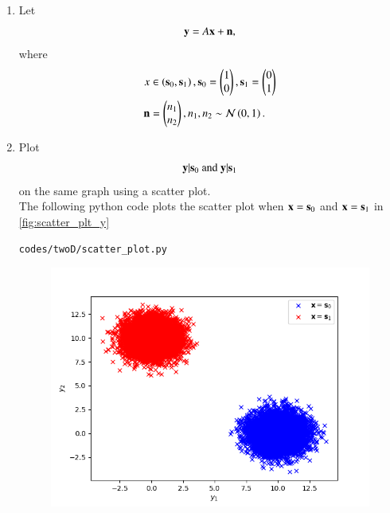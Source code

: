 \begin{enumerate}[label=\thesection.\arabic*.,ref=\thesection.\theenumi]
\item Let 
\begin{equation}
\mathbf{y} = A\mathbf{x} + \mathbf{n},
\end{equation}
where 
\begin{align}
x &\in \left(\mathbf{s}_0,\mathbf{s}_1\right), 
\mathbf{s}_0 = 
\begin{pmatrix}
1 
\\
0
\end{pmatrix},
\mathbf{s}_1 = 
\begin{pmatrix}
0 
\\
1
\end{pmatrix}
\\
\mathbf{n} &= 
\begin{pmatrix}
n_1
\\
n_2
\end{pmatrix},
n_1,n_2 \sim \mathcal{N}\left(0,1\right).
\end{align}
%
\item
\label{ch5_fsk}
Plot 
%
\begin{equation}
\mathbf{y}|\mathbf{s}_0 \text{ and } \mathbf{y}|\mathbf{s}_1
\end{equation}
%
on the same graph using a scatter plot.
\\
\solution The following python code plots the scatter plot when $\mathbf{x} = \mathbf{s}_0$ and $\mathbf{x} = \mathbf{s}_1$ in \ref{fig:scatter_plt_y}
\begin{lstlisting}
codes/twoD/scatter_plot.py
\end{lstlisting}
\begin{figure}
\centering
\includegraphics[width=\columnwidth]{./figs/twoD/scatter_plot.png}

\end{figure}
\end{enumerate}
